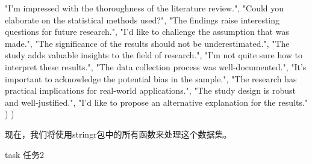 \documentclass[]{book}
\newenvironment{Shaded}{\begin{snugshade}}{\end{snugshade}}
\newcommand{\NormalTok}[1]{#1}
\newcommand{\StringTok}[1]{\textcolor[rgb]{0.31,0.60,0.02}{#1}}
\begin{document}
\begin{Shaded}
\begin{Highlighting}[]
    \StringTok{"I'm impressed with the thoroughness of the literature review."}\NormalTok{,}
    \StringTok{"Could you elaborate on the statistical methods used?"}\NormalTok{,}
    \StringTok{"The findings raise interesting questions for future research."}\NormalTok{,}
    \StringTok{"I'd like to challenge the assumption that was made."}\NormalTok{,}
    \StringTok{"The significance of the results should not be underestimated."}\NormalTok{,}
    \StringTok{"The study adds valuable insights to the field of research."}\NormalTok{,}
    \StringTok{"I'm not quite sure how to interpret these results."}\NormalTok{,}
    \StringTok{"The data collection process was well-documented."}\NormalTok{,}
    \StringTok{"It's important to acknowledge the potential bias in the sample."}\NormalTok{,}
    \StringTok{"The research has practical implications for real-world applications."}\NormalTok{,}
    \StringTok{"The study design is robust and well-justified."}\NormalTok{,}
    \StringTok{"I'd like to propose an alternative explanation for the results."}
\NormalTok{  )}
\NormalTok{)}
\end{Highlighting}
\end{Shaded}

现在，我们将使用stringr包中的所有函数来处理这个数据集。

\begin{infobox}task
任务2

\end{infobox}
\end{document}
